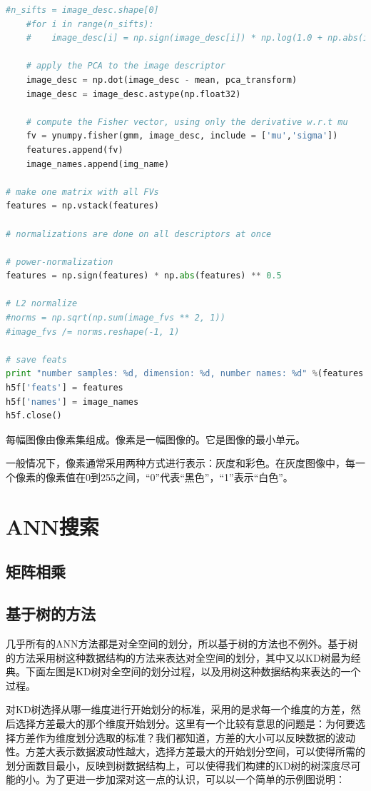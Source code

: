 \documentclass[color=cyan,mathpazo,titlestyle=hang]{elegantbook}
\begin{document}
\begin{lstlisting}[language=python]
    #n_sifts = image_desc.shape[0]
    #for i in range(n_sifts):
    #    image_desc[i] = np.sign(image_desc[i]) * np.log(1.0 + np.abs(image_desc[i]))

    # apply the PCA to the image descriptor
    image_desc = np.dot(image_desc - mean, pca_transform)
    image_desc = image_desc.astype(np.float32)

    # compute the Fisher vector, using only the derivative w.r.t mu
    fv = ynumpy.fisher(gmm, image_desc, include = ['mu','sigma'])
    features.append(fv)
    image_names.append(img_name)

# make one matrix with all FVs
features = np.vstack(features)

# normalizations are done on all descriptors at once

# power-normalization
features = np.sign(features) * np.abs(features) ** 0.5

# L2 normalize
#norms = np.sqrt(np.sum(image_fvs ** 2, 1))
#image_fvs /= norms.reshape(-1, 1)

# save feats
print "number samples: %d, dimension: %d, number names: %d" %(features.shape[0], features.shape[1], len(image_names))
h5f['feats'] = features
h5f['names'] = image_names
h5f.close()	
\end{lstlisting}


每幅图像由像素集组成。像素是一幅图像的{\color{red}{原材料，积木}}。它是图像的最小单元。

一般情况下，像素通常采用两种方式进行表示：灰度和彩色。在灰度图像中，每一个像素的像素值在0到255之间，“0”代表“黑色”，“1”表示“白色”。

\chapter{ANN搜索}

\section{矩阵相乘}

\section{基于树的方法}

几乎所有的ANN方法都是对全空间的划分，所以基于树的方法也不例外。基于树的方法采用树这种数据结构的方法来表达对全空间的划分，其中又以KD树最为经典。下面左图是KD树对全空间的划分过程，以及用树这种数据结构来表达的一个过程。

对KD树选择从哪一维度进行开始划分的标准，采用的是求每一个维度的方差，然后选择方差最大的那个维度开始划分。这里有一个比较有意思的问题是：为何要选择方差作为维度划分选取的标准？我们都知道，方差的大小可以反映数据的波动性。方差大表示数据波动性越大，选择方差最大的开始划分空间，可以使得所需的划分面数目最小，反映到树数据结构上，可以使得我们构建的KD树的树深度尽可能的小。为了更进一步加深对这一点的认识，可以以一个简单的示例图说明：
\end{document}
